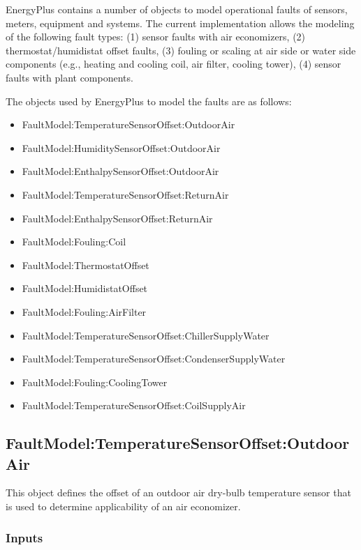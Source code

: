 EnergyPlus contains a number of objects to model operational faults of sensors, meters, equipment and systems. The current implementation allows the modeling of the following fault types: (1) sensor faults with air economizers, (2) thermostat/humidistat offset faults, (3) fouling or scaling at air side or water side components (e.g., heating and cooling coil, air filter, cooling tower), (4) sensor faults with plant components.

The objects used by EnergyPlus to model the faults are as follows:

\begin{itemize}
\item
  FaultModel:TemperatureSensorOffset:OutdoorAir
\item
  FaultModel:HumiditySensorOffset:OutdoorAir
\item
  FaultModel:EnthalpySensorOffset:OutdoorAir
\item
  FaultModel:TemperatureSensorOffset:ReturnAir
\item
  FaultModel:EnthalpySensorOffset:ReturnAir
\item
  FaultModel:Fouling:Coil
\item
  FaultModel:ThermostatOffset
\item
  FaultModel:HumidistatOffset
\item
  FaultModel:Fouling:AirFilter
\item
  FaultModel:TemperatureSensorOffset:ChillerSupplyWater
\item
  FaultModel:TemperatureSensorOffset:CondenserSupplyWater
\item
  FaultModel:Fouling:CoolingTower
\item
  FaultModel:TemperatureSensorOffset:CoilSupplyAir
\end{itemize}

\subsection{FaultModel:TemperatureSensorOffset:OutdoorAir}\label{faultmodeltemperaturesensoroffsetoutdoorair}

This object defines the offset of an outdoor air dry-bulb temperature sensor that is used to determine applicability of an air economizer.

\subsubsection{Inputs}\label{inputs-029}

